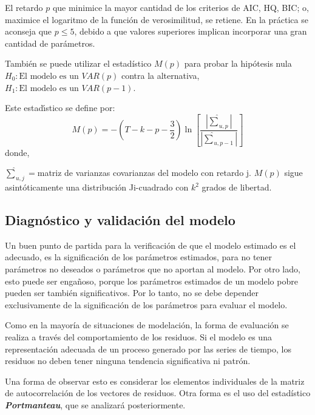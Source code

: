 \begin{observacion}
El retardo $p$ que minimice la mayor cantidad de los criterios de AIC, HQ, BIC; o, maximice el logaritmo de la funci\'{o}n de 
verosimilitud, se retiene. En la pr\'{a}ctica se aconseja que $p\le 5$, debido a que valores superiores implican incorporar una gran cantidad de par\'{a}metros.\newline

Tambi\'{e}n se puede utilizar el estad\'{i}stico $M\left( p \right)$ para probar la hip\'{o}tesis nula $H_{0}: \text{El modelo es un }VAR\left( p \right)$ contra la alternativa, $H_{1}: \text{El modelo es un }VAR(p-1)$. 

Este estad\'{\i}stico se define por:
\[
M\left( p \right)=-\left( T-k-p-\frac{3}{2} \right)\ln \left[ \frac{\left| \hat{\sum }_{u,p} \right|}{\left| \hat{\sum }_{u,p-1} \right|} \right]
\]
donde, 

$\hat{\sum }_{u,j}=$matriz de varianzas covarianzas del modelo con retardo j.\newline
$M\left( p \right)$ sigue asint\'{o}ticamente una distribuci\'{o}n Ji-cuadrado con $k^{2}$ grados de libertad.
\end{observacion}

\subsection{Diagn\'{o}stico y validaci\'{o}n del modelo}
\label{subsubsec:mylabel11}

Un buen punto de partida para la verificaci\'{o}n de que el modelo estimado es el adecuado, es la significaci\'{o}n de los par\'{a}metros estimados, para no tener par\'{a}metros no deseados o par\'{a}metros que no aportan al modelo. Por otro lado, esto puede ser enga\~{n}oso, porque los par\'{a}metros estimados de un modelo pobre pueden ser tambi\'{e}n significativos. Por lo tanto, no se debe depender exclusivamente de la significaci\'{o}n de los 
par\'{a}metros para evaluar el modelo.\newline

Como en la mayor\'{i}a de situaciones de modelaci\'{o}n, la forma de evaluaci\'{o}n se realiza a trav\'{e}s del comportamiento de los residuos. Si el modelo es una representaci\'{o}n adecuada de un proceso generado por las series de tiempo, los residuos no deben tener ninguna tendencia significativa ni patr\'{o}n.\newline

Una forma de observar esto es considerar los elementos individuales de la matriz de autocorrelaci\'{o}n de los vectores de residuos. Otra forma es el uso del estad\'{i}stico \textbf{\textit{Portmanteau}}, que se analizar\'{a} posteriormente.

